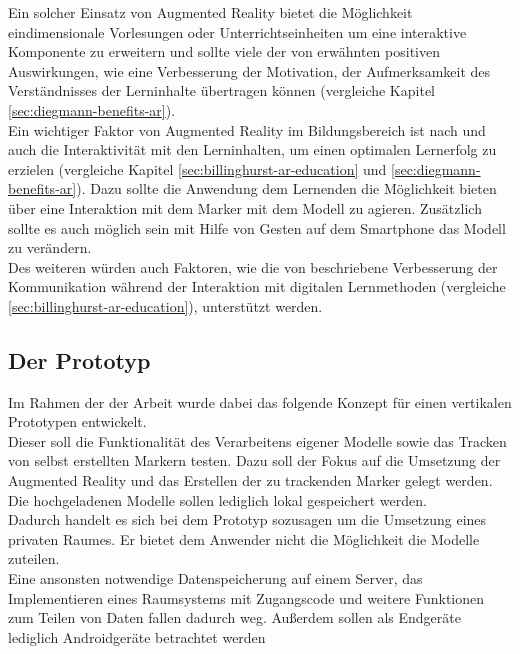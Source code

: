 Ein solcher Einsatz von Augmented Reality bietet die Möglichkeit eindimensionale Vorlesungen oder Unterrichtseinheiten um eine interaktive Komponente zu erweitern und sollte viele der von \citeauthor{diegmann:benefits-ar} erwähnten positiven Auswirkungen, wie 
eine Verbesserung der  Motivation, der Aufmerksamkeit des Verständnisses der Lerninhalte übertragen können (vergleiche Kapitel \ref{sec:diegmann-benefits-ar}). \\
Ein wichtiger Faktor von Augmented Reality im Bildungsbereich ist nach \citeauthor{billinghurst:ar-in-education} und\citeauthor{diegmann:benefits-ar} auch die Interaktivität mit den Lerninhalten, um einen optimalen Lernerfolg zu erzielen (vergleiche Kapitel \ref{sec:billinghurst-ar-education} und \ref{sec:diegmann-benefits-ar}). Dazu sollte die Anwendung dem Lernenden die Möglichkeit bieten über eine Interaktion mit dem Marker mit dem Modell zu agieren. Zusätzlich sollte es auch möglich sein mit Hilfe von Gesten auf dem Smartphone das Modell zu verändern. \\
Des weiteren würden auch Faktoren, wie die von \citeauthor{billinghurst:ar-in-education} beschriebene Verbesserung der Kommunikation während der Interaktion mit digitalen Lernmethoden (vergleiche \ref{sec:billinghurst-ar-education}), unterstützt werden. 

\subsection{Der Prototyp}
Im Rahmen der der Arbeit wurde dabei das folgende Konzept für einen vertikalen Prototypen entwickelt. \\
Dieser soll die Funktionalität des Verarbeitens eigener Modelle sowie das Tracken von selbst erstellten Markern testen.
Dazu soll der Fokus auf die Umsetzung der Augmented Reality und das Erstellen der zu trackenden Marker gelegt werden. Die hochgeladenen Modelle sollen lediglich lokal gespeichert werden. \\
Dadurch handelt es sich bei dem Prototyp sozusagen um die Umsetzung eines \glqq privaten Raumes\grqq . Er bietet dem Anwender nicht die Möglichkeit die Modelle zuteilen.\\ 
Eine ansonsten notwendige Datenspeicherung auf einem Server, das Implementieren eines Raumsystems mit Zugangscode und weitere Funktionen zum Teilen von Daten fallen dadurch weg. Außerdem sollen als Endgeräte lediglich Androidgeräte betrachtet werden


